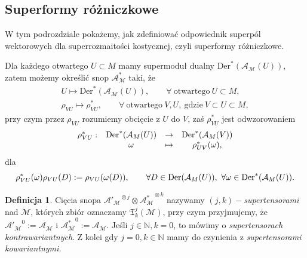 \documentclass[11pt,a4paper]{report}
\theoremstyle{definition}
\newtheorem{definition}[theorem]{Definicja}
\begin{document}
\subsection{Superformy różniczkowe}
		      			
W tym podrozdziale pokażemy, jak zdefiniować odpowiednik superpól wektorowych dla superrozmaitości kostycznej, czyli superformy różniczkowe. 
		      			
Dla każdego otwartego $U \subset M$ mamy supermoduł dualny $\mathrm{Der}^*(\mathcal{A_M}(U))$, zatem możemy określić snop $\mathcal{A^*_M}$ taki, że
\begin{equation}
	\begin{gathered}
		U \mapsto \mathrm{Der}^*(\mathcal{A_M}(U)), \qquad \forall \mathrm{\ otwartego\ }U \subset M, \\
		\rho_{VU} \mapsto \rho^*_{VU}, \qquad \forall \mathrm{\ otwartego\ } V,U, \mathrm{\ gdzie\ } V \subset U \subset M,
	\end{gathered}
\end{equation}
przy czym przez $\rho_{VU}$ rozumiemy obcięcie z $U$ do $V$, zaś $\rho^*_{VU}$ jest odwzorowaniem
\begin{equation}
	\begin{array}{rccc}
		\rho^*_{VU}: & {\rm Der}^*(\mathcal{A}_M(U)) & \rightarrow & {\rm Der}^*(\mathcal{A}_M(V)) \\
		             & \omega                        & \mapsto     & \rho^*_{UV}(\omega),          
	\end{array}
\end{equation}
dla
\begin{equation*}
	\rho^*_{VU}(\omega)\rho_{VU}(D):=\rho_{VU}(\omega(D)),\qquad \forall D\in {\rm Der}(\mathcal{A}_M(U)),\ \forall \omega\in {\rm Der}^*(\mathcal{A}_M(U)).
\end{equation*}
		      			
\begin{definition}
	Cięcia snopa $\mathcal{A'_M}^{\!\!\!\!\otimes j} \otimes \mathcal{A^*_M}^{\!\!\!\!\otimes k}$ nazywamy \textit{$(j,k)-$supertensorami} nad $\mathcal{M}$, których zbiór oznaczamy $\mathfrak{T}^j_k(\mathcal{M})$, przy czym przyjmujemy, że $\mathcal{A'_M}^{\!\!\!\!0} := \mathcal{A_M}$ i $ \mathcal{A^*_M}^{\!\!\!\!0} := \mathcal{A_M}.$ Jeśli $j \in \mathbb{N}, k=0$, to mówimy o \textit{supertensorach kontrawariantnych}. Z kolei gdy $j = 0, k \in \mathbb{N}$ mamy do czynienia z \textit{supertensorami kowariantnymi.}
\end{definition}
		      			
\end{document}
